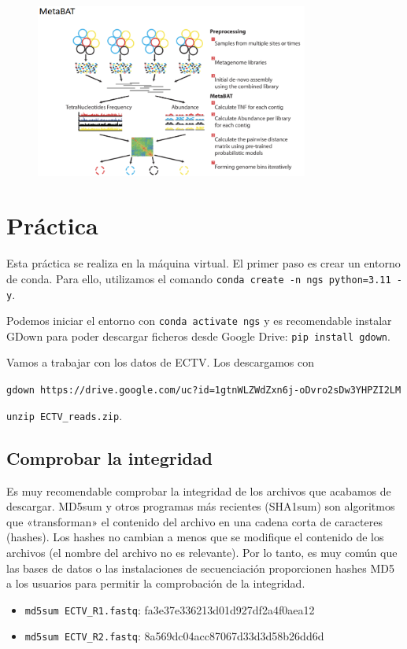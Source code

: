 \begin{figure}[h]
\centering
\includegraphics[width = 0.8\textwidth]{figs/metabat.png}
\end{figure}

\section{Práctica}
Esta práctica se realiza en la máquina virtual. El primer paso es crear un entorno de conda. Para ello, utilizamos el comando \texttt{conda create -n ngs python=3.11 -y}.

Podemos iniciar el entorno con \texttt{conda activate ngs} y es recomendable instalar GDown para poder descargar ficheros desde Google Drive: \texttt{pip install gdown}.

Vamos a trabajar con los datos de ECTV. Los descargamos con 

\texttt{gdown https://drive.google.com/uc?id=1gtnWLZWdZxn6j-oDvro2sDw3YHPZI2LM} 

\texttt{unzip ECTV\_reads.zip}.

\subsection{Comprobar la integridad}
Es muy recomendable comprobar la integridad de los archivos que acabamos de descargar. MD5sum y otros programas más recientes (SHA1sum) son algoritmos que «transforman» el contenido del archivo en una cadena corta de caracteres (hashes). Los hashes no cambian a menos que se modifique el contenido de los archivos (el nombre del archivo no es relevante). Por lo tanto, es muy común que las bases de datos o las instalaciones de secuenciación proporcionen hashes MD5 a los usuarios para permitir la comprobación de la integridad.
\begin{itemize}
\item \texttt{md5sum ECTV\_R1.fastq}: fa3e37e336213d01d927df2a4f0aea12
\item \texttt{md5sum ECTV\_R2.fastq}: 8a569dc04acc87067d33d3d58b26dd6d
\end{itemize}

